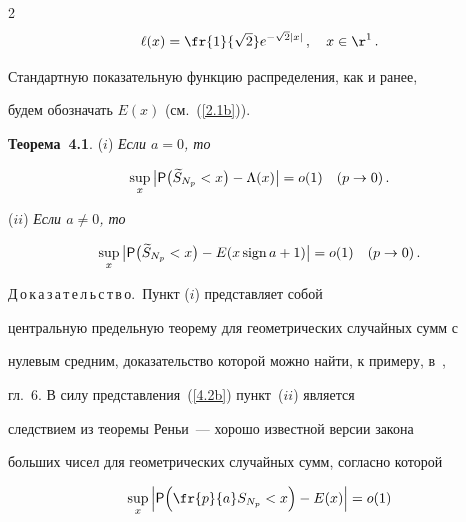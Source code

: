 \begin{multicols}{2}
$$


\ell(x)=\fr{1}{\sqrt{2}}e^{-\sqrt{2}|x|}\,,\quad x\in{\r}^1\,.


$$





Стандартную показательную функцию распределения, как и ранее,


будем обозначать $E(x)$ (см.~(\ref{2.1b})).





\medskip





\noindent


{\bf Теорема~4.1}. ($i$) {\it Если $a=0$, то}


$$


\sup_x\big|{\sf P}\big(\widetilde


S_{N_p}<x\big)-\Lambda(x)\big|=o(1)\quad (p\to0)\,.


$$


($ii$) {\it Если $a\neq 0$, то}


$$


\sup_x\big|{\sf P}\big(\widetilde


S_{N_p}<x\big)-E(x\,\mathrm{sign}\,a+1)\big|=o(1)\quad


(p\to0)\,.


$$





\smallskip





\noindent


Д\,о\,к\,а\,з\,а\,т\,е\,л\,ь\,с\,т\,в\,о.~Пункт ($i$) представляет собой


центральную предельную теорему для гео\-мет\-ри\-че\-ских случайных сумм с


нулевым средним, доказательство которой можно найти, к примеру, в~\cite{14be},


гл.~6. В силу представления~(\ref{4.2b}) пункт~($ii$) является


следствием из теоремы Реньи~--- хорошо известной версии закона


больших чисел для геометрических случайных сумм, согласно которой


$$


\sup_x\Big|{\sf P}\Big(\fr{p}{a}S_{N_p}<x\Big)-E(x)\Big|=o(1)


$$



\end{multicols}
